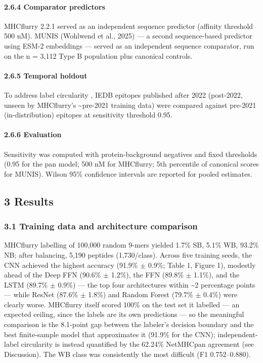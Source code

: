 \documentclass[10pt]{article}
\begin{document}
\paragraph{2.6.4 Comparator predictors}\label{comparator-predictors}

MHCflurry 2.2.1 \cite{ODonnell20} served as an independent
sequence predictor (affinity threshold 500 nM). MUNIS (Wohlwend et al.,
2025) --- a second sequence-based predictor using ESM-2 embeddings
\cite{Rives21} --- served as an independent sequence comparator,
run on the n = 3,112 Type B population plus canonical controls.

\paragraph{2.6.5 Temporal holdout}\label{temporal-holdout}

To address label circularity \cite{Preibisch26}, IEDB epitopes
published after 2022 (post-2022, unseen by MHCflurry's
\textasciitilde pre-2021 training data) were compared against pre-2021
(in-distribution) epitopes at sensitivity threshold 0.95.

\paragraph{2.6.6 Evaluation}\label{evaluation}

Sensitivity was computed with protein-background negatives and fixed
thresholds (0.95 for the pan model; 500 nM for MHCflurry; 5th percentile
of canonical scores for MUNIS). Wilson 95\% confidence intervals are
reported for pooled estimates.

\subsection{3 Results}\label{results}

\subsubsection{3.1 Training data and architecture
comparison}\label{training-data-and-architecture-comparison}

MHCflurry labelling of 100,000 random 9-mers yielded 1.7\% SB, 5.1\% WB,
93.2\% NB; after balancing, 5,190 peptides (1,730/class). Across five
training seeds, the CNN achieved the highest accuracy (91.9\% $\pm$ 0.9\%;
Table 1, Figure 1), modestly ahead of the Deep FFN (90.6\% $\pm$ 1.2\%), the
FFN (89.8\% $\pm$ 1.1\%), and the LSTM (89.7\% $\pm$ 0.9\%) --- the top four
architectures within \textasciitilde2 percentage points --- while ResNet
(87.6\% $\pm$ 1.8\%) and Random Forest (79.7\% $\pm$ 0.4\%) were clearly worse.
MHCflurry itself scored 100\% on the test set it labelled --- an
expected ceiling, since the labels are its own predictions --- so the
meaningful comparison is the 8.1-point gap between the labeler's
decision boundary and the best finite-sample model that approximates it
(91.9\% for the CNN); independent-label circularity is instead
quantified by the 62.24\% NetMHCpan agreement (see Discussion). The WB
class was consistently the most difficult (F1 0.752--0.880).
\end{document}
